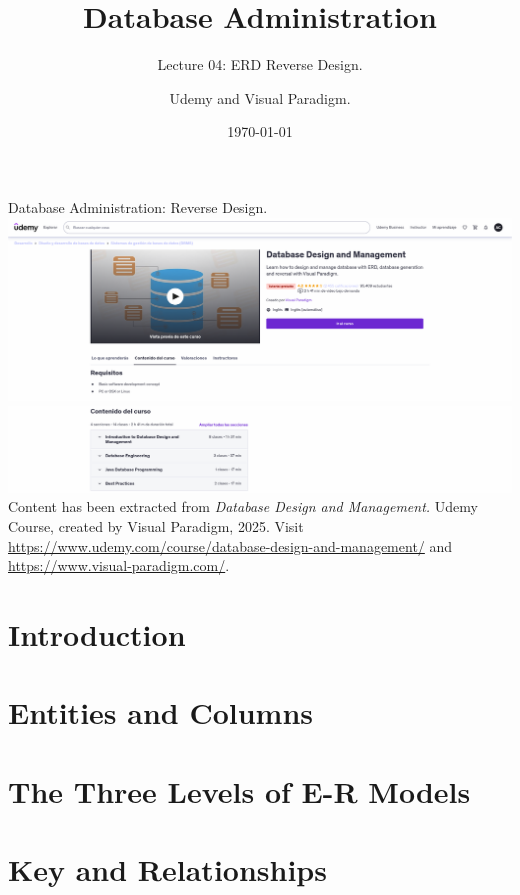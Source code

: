 \documentclass{beamer}
\title[Reverse Design]{Database Administration}
\subtitle{Lecture 04: ERD Reverse Design.}
\author{Udemy and Visual Paradigm.}
\date{\today}
\begin{document}
\frame{\titlepage}

\begin{frame}{Database Administration: Reverse Design.}
    \centering
    \includegraphics[width=\textwidth]{figures/udemy2}\\
    \includegraphics[width=\textwidth]{figures/udemy3}\\
    \vspace{2mm}
    {
        \scriptsize
        Content has been extracted from \textit{Database Design and Management.} Udemy Course, created by Visual Paradigm, 2025.  Visit \url{https://www.udemy.com/course/database-design-and-management/} and \url{https://www.visual-paradigm.com/}.\\
    }
\end{frame}

\section{Introduction}


\section{Entities and Columns}


\section{The Three Levels of E-R Models}


\section{Key and Relationships}

\end{document}
